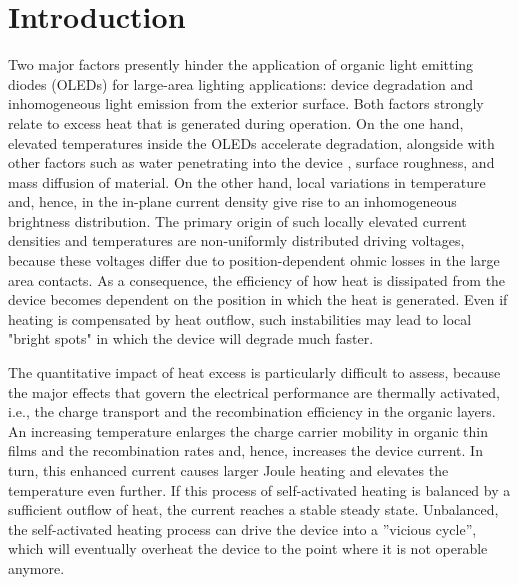\documentclass[%
9pt,
 aip,
rsi,%
 amsmath,amssymb,
preprint,%
]{revtex4-1}
\newcommand{\thermalconductivity}{$\mathrm{W m^{-1} K^{-1}}$}
\newcommand{\hcoefficient}{$\mathrm{W m^{-2} K^{-1}}$}
\begin{document}
\section{Introduction}
Two major factors presently hinder the application of organic light emitting diodes (OLEDs) for large-area lighting applications: device degradation and inhomogeneous light emission from the exterior surface.\cite{Park2011}
Both factors strongly relate to excess heat that is generated during operation.
On the one hand, elevated temperatures inside the OLEDs accelerate degradation,\cite{Xu2004,Zhou2000,Nenna2007} alongside with other factors such as water penetrating into the device \cite{Li2016}, surface roughness, and mass diffusion of material.
On the other hand, local variations in temperature and, hence, in the in-plane current density give rise to an inhomogeneous brightness distribution.\cite{Garditz2007,Kohari2013} 
The primary origin of such locally elevated current densities and temperatures are non-uniformly distributed driving voltages, because these voltages differ due to position-dependent ohmic losses in the large area contacts.\cite{Fischer2014} 
As a consequence, the efficiency of how heat is dissipated from the device becomes dependent on the position in which the heat is generated. 
Even if heating is compensated by heat outflow,\cite{Park2014} such instabilities may lead to local "bright spots" in which the device will degrade much faster.

The quantitative impact of heat excess is particularly difficult to assess, because the major effects that govern the electrical performance are thermally activated, i.e., the charge transport and the recombination efficiency in the organic layers. 
An increasing temperature enlarges the charge carrier mobility in organic thin films\cite{Bassler1993} and the recombination rates and, hence, increases the device current. In turn, this enhanced current causes larger Joule heating and elevates the temperature even further.
If this process of self-activated heating is balanced by a sufficient outflow of heat, the current reaches a stable steady state. 
Unbalanced, the self-activated heating process can drive the device into a ''vicious cycle'', which will eventually overheat the device to the point where it is not operable anymore.
\end{document}
